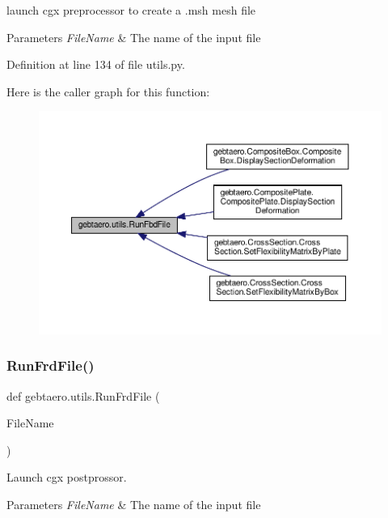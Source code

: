 launch cgx preprocessor to create a .msh mesh file 


\begin{DoxyParams}{Parameters}
{\em File\+Name} & The name of the input file \\
\hline
\end{DoxyParams}


Definition at line 134 of file utils.\+py.

Here is the caller graph for this function\+:
\nopagebreak
\begin{figure}[H]
\begin{center}
\leavevmode
\includegraphics[width=350pt]{namespacegebtaero_1_1utils_a37d973efabdd0beca6418265ffa57d32_icgraph}
\end{center}
\end{figure}
\mbox{\label{namespacegebtaero_1_1utils_a553253bef10c3bec37dc0d858b03dc71}} 
\subsubsection{\texorpdfstring{Run\+Frd\+File()}{RunFrdFile()}}
{\footnotesize\ttfamily def gebtaero.\+utils.\+Run\+Frd\+File (\begin{DoxyParamCaption}\item[{}]{File\+Name }\end{DoxyParamCaption})}



Launch cgx postprossor. 


\begin{DoxyParams}{Parameters}
{\em File\+Name} & The name of the input file \\
\hline
\end{DoxyParams}


